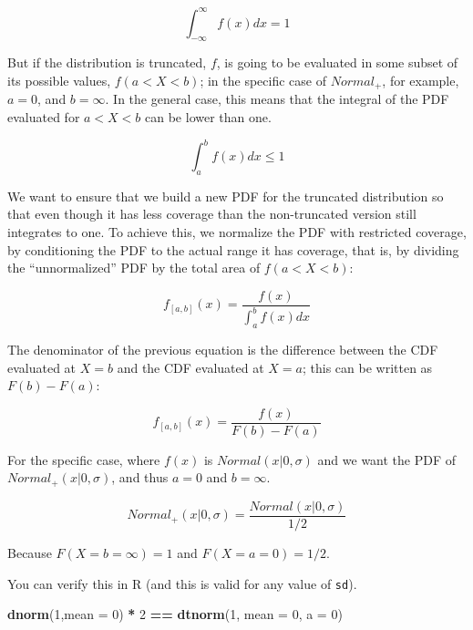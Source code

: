 \documentclass[12pt,]{krantz}
\newenvironment{Shaded}{\begin{snugshade}}{\end{snugshade}}
\newcommand{\KeywordTok}[1]{\textcolor[rgb]{0.13,0.29,0.53}{\textbf{#1}}}
\newcommand{\DataTypeTok}[1]{\textcolor[rgb]{0.13,0.29,0.53}{#1}}
\newcommand{\DecValTok}[1]{\textcolor[rgb]{0.00,0.00,0.81}{#1}}
\newcommand{\StringTok}[1]{\textcolor[rgb]{0.31,0.60,0.02}{#1}}
\newcommand{\OperatorTok}[1]{\textcolor[rgb]{0.81,0.36,0.00}{\textbf{#1}}}
\newcommand{\NormalTok}[1]{#1}
\theoremstyle{definition}
\theoremstyle{definition}
\theoremstyle{definition}
\theoremstyle{remark}
\begin{document}
\begin{equation}
\int_{-\infty}^{\infty} f(x) dx = 1
\end{equation}

But if the distribution is truncated, \(f\), is going to be evaluated in
some subset of its possible values, \(f(a <X < b)\); in the specific
case of \(Normal_+\), for example, \(a = 0\), and \(b=\infty\). In the
general case, this means that the integral of the PDF evaluated for
\(a <X < b\) can be lower than one.

\begin{equation}
\int_{a}^{b} f(x) dx \leq 1
\end{equation}

We want to ensure that we build a new PDF for the truncated distribution
so that even though it has less coverage than the non-truncated version
still integrates to one. To achieve this, we normalize the PDF with
restricted coverage, by conditioning the PDF to the actual range it has
coverage, that is, by dividing the ``unnormalized'' PDF by the total
area of \(f(a <X < b)\):

\begin{equation}
f_{[a,b]}(x) = \frac{f(x)}{\int_{a}^{b} f(x) dx}
\end{equation}

The denominator of the previous equation is the difference between the
CDF evaluated at \(X = b\) and the CDF evaluated at \(X =a\); this can
be written as \(F(b) - F(a)\):

\begin{equation}
f_{[a,b]}(x) = \frac{f(x)}{F(b) - F(a)}
\label{eq:truncPDF}
\end{equation}

For the specific case, where \(f(x)\) is \(Normal(x | 0, \sigma)\) and
we want the PDF of \(Normal_+(x | 0, \sigma)\), and thus \(a= 0\) and
\(b =\infty\).

\begin{equation}
Normal_+(x |0, \sigma) = \frac{Normal(x | 0, \sigma)}{1/2}
\end{equation}

Because \(F(X= b =\infty) = 1\) and \(F(X = a = 0) = 1/2\).

You can verify this in R (and this is valid for any value of
\texttt{sd}).

\begin{Shaded}
\begin{Highlighting}[]
\KeywordTok{dnorm}\NormalTok{(}\DecValTok{1}\NormalTok{,}\DataTypeTok{mean =} \DecValTok{0}\NormalTok{) }\OperatorTok{*}\StringTok{ }\DecValTok{2} \OperatorTok{==}\StringTok{ }\KeywordTok{dtnorm}\NormalTok{(}\DecValTok{1}\NormalTok{, }\DataTypeTok{mean =} \DecValTok{0}\NormalTok{, }\DataTypeTok{a =} \DecValTok{0}\NormalTok{)}
\end{Highlighting}
\end{Shaded}
\end{document}
